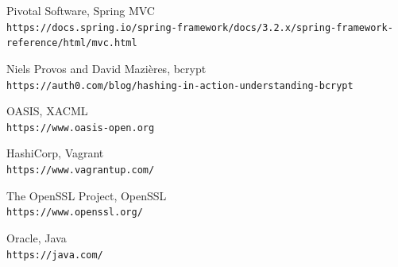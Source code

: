\begin{thebibliography}{9}
Pivotal Software, Spring MVC
\\\texttt{https://docs.spring.io/spring-framework/docs/3.2.x/spring-framework-reference/html/mvc.html}

Niels Provos and David Mazières, bcrypt
\\\texttt{https://auth0.com/blog/hashing-in-action-understanding-bcrypt}

OASIS, XACML
\\\texttt{https://www.oasis-open.org}

HashiCorp, Vagrant
\\\texttt{https://www.vagrantup.com/}

The OpenSSL Project, OpenSSL
\\\texttt{https://www.openssl.org/}

Oracle, Java
\\\texttt{https://java.com/}


\end{thebibliography}

